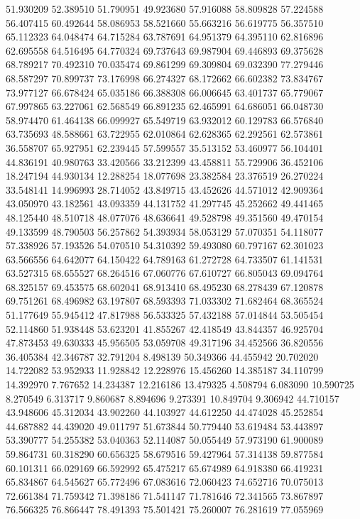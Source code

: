 51.930209
52.389510
51.790951
49.923680
57.916088
58.809828
57.224588
56.407415
60.492644
58.086953
58.521660
55.663216
56.619775
56.357510
65.112323
64.048474
64.715284
63.787691
64.951379
64.395110
62.816896
62.695558
64.516495
64.770324
69.737643
69.987904
69.446893
69.375628
68.789217
70.492310
70.035474
69.861299
69.309804
69.032390
77.279446
68.587297
70.899737
73.176998
66.274327
68.172662
66.602382
73.834767
73.977127
66.678424
65.035186
66.388308
66.006645
63.401737
65.779067
67.997865
63.227061
62.568549
66.891235
62.465991
64.686051
66.048730
58.974470
61.464138
66.099927
65.549719
63.932012
60.129783
66.576840
63.735693
48.588661
63.722955
62.010864
62.628365
62.292561
62.573861
36.558707
65.927951
62.239445
57.599557
35.513152
53.460977
56.104401
44.836191
40.980763
33.420566
33.212399
43.458811
55.729906
36.452106
18.247194
44.930134
12.288254
18.077698
23.382584
23.376519
26.270224
33.548141
14.996993
28.714052
43.849715
43.452626
44.571012
42.909364
43.050970
43.182561
43.093359
44.131752
41.297745
45.252662
49.441465
48.125440
48.510718
48.077076
48.636641
49.528798
49.351560
49.470154
49.133599
48.790503
56.257862
54.393934
58.053129
57.070351
54.118077
57.338926
57.193526
54.070510
54.310392
59.493080
60.797167
62.301023
63.566556
64.642077
64.150422
64.789163
61.272728
64.733507
61.141531
63.527315
68.655527
68.264516
67.060776
67.610727
66.805043
69.094764
68.325157
69.453575
68.602041
68.913410
68.495230
68.278439
67.120878
69.751261
68.496982
63.197807
68.593393
71.033302
71.682464
68.365524
51.177649
55.945412
47.817988
56.533325
57.432188
57.014844
53.505454
52.114860
51.938448
53.623201
41.855267
42.418549
43.844357
46.925704
47.873453
49.630333
45.956505
53.059708
49.317196
34.452566
36.820556
36.405384
42.346787
32.791204
8.498139
50.349366
44.455942
20.702020
14.722082
53.952933
11.928842
12.228976
15.456260
14.385187
34.110799
14.392970
7.767652
14.234387
12.216186
13.479325
4.508794
6.083090
10.590725
8.270549
6.313717
9.860687
8.894696
9.273391
10.849704
9.306942
44.710157
43.948606
45.312034
43.902260
44.103927
44.612250
44.474028
45.252854
44.687882
44.439020
49.011797
51.673844
50.779440
53.619484
53.443897
53.390777
54.255382
53.040363
52.114087
50.055449
57.973190
61.900089
59.864731
60.318290
60.656325
58.679516
59.427964
57.314138
59.877584
60.101311
66.029169
66.592992
65.475217
65.674989
64.918380
66.419231
65.834867
64.545627
65.772496
67.083616
72.060423
74.652716
70.075013
72.661384
71.759342
71.398186
71.541147
71.781646
72.341565
73.867897
76.566325
76.866447
78.491393
75.501421
75.260007
76.281619
77.055969

